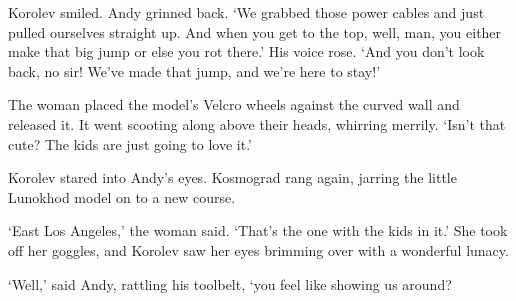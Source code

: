 Korolev smiled. Andy grinned back. `We grabbed those power cables and just pulled ourselves straight up. And when you get to the top, well, man, you either make that big jump or else you rot there.' His voice rose. `And you don't look back, no sir! We've made that jump, and we're here to stay!'

The woman placed the model's Velcro wheels against the curved wall and released it. It went scooting along above their heads, whirring merrily. `Isn't that cute? The kids are just going to love it.'

Korolev stared into Andy's eyes. Kosmograd rang again, jarring the little Lunokhod model on to a new course.

`East Los Angeles,' the woman said. `That's the one with the kids in it.' She took off her goggles, and Korolev saw her eyes brimming over with a wonderful lunacy.

`Well,' said Andy, rattling his toolbelt, `you feel like showing us around?